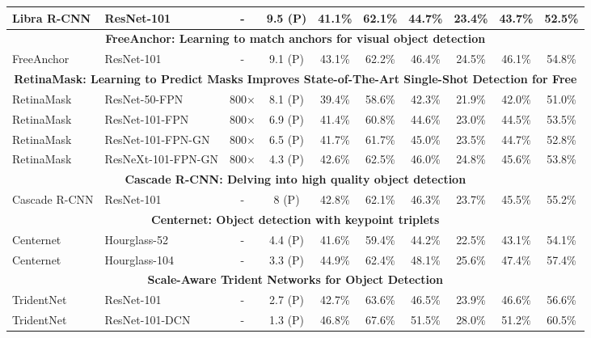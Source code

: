 \documentclass[10pt,twocolumn,letterpaper]{article}
\begin{document}
\begin{table*}[h]
\begin{threeparttable}[h]
\begin{tabular}{llcccccccc}
			Libra R-CNN & ResNet-101 & - & 9.5 (P) & 41.1\% & 62.1\% & 44.7\% & 23.4\% & 43.7\% & 52.5\% \\
			\midrule
			\multicolumn{10}{c}{\textbf{FreeAnchor: Learning to match anchors for visual object detection} \cite{zhang2019freeanchor}} \\
			FreeAnchor & ResNet-101 & - & 9.1 (P) & 43.1\% & 62.2\% & 46.4\% & 24.5\% & 46.1\% & 54.8\% \\
			\midrule
			\multicolumn{10}{c}{\textbf{RetinaMask: Learning to Predict Masks Improves State-of-The-Art Single-Shot Detection for Free \cite{fu2019retinamask}}} \\
			RetinaMask & ResNet-50-FPN & 800$\times$ & 8.1 (P) & 39.4\% & 58.6\% & 42.3\% & 21.9\% & 42.0\% & 51.0\% \\
			RetinaMask & ResNet-101-FPN & 800$\times$ & 6.9 (P) & 41.4\% & 60.8\% & 44.6\% & 23.0\% & 44.5\% & 53.5\% \\
			RetinaMask & ResNet-101-FPN-GN & 800$\times$ & 6.5 (P) & 41.7\% & 61.7\% & 45.0\% & 23.5\% & 44.7\% & 52.8\% \\
			RetinaMask & ResNeXt-101-FPN-GN & 800$\times$ & 4.3 (P) & 42.6\% & 62.5\% & 46.0\% & 24.8\% & 45.6\% & 53.8\% \\
			\midrule
			\multicolumn{10}{c}{\textbf{Cascade R-CNN: Delving into high quality object detection} \cite{cai2018cascade}} \\
			Cascade R-CNN & ResNet-101 & - & 8 (P) & 42.8\% & 62.1\% & 46.3\% & 23.7\% & 45.5\% & 55.2\% \\
			\midrule
			\multicolumn{10}{c}{\textbf{Centernet: Object detection with keypoint triplets} \cite{duan2019centernet}} \\
			Centernet & Hourglass-52 & - & 4.4 (P) & 41.6\% & 59.4\% & 44.2\% & 22.5\% & 43.1\% & 54.1\% \\
			Centernet & Hourglass-104 & - & 3.3 (P) & 44.9\% & 62.4\% & 48.1\% & 25.6\% & 47.4\% & 57.4\% \\
			\midrule
			\multicolumn{10}{c}{\textbf{Scale-Aware Trident Networks for Object Detection} \cite{li2019scale}} \\
			TridentNet & ResNet-101 & - & 2.7 (P) & 42.7\% & 63.6\% & 46.5\% & 23.9\% & 46.6\% & 56.6\% \\
			TridentNet & ResNet-101-DCN & - & 1.3 (P) & 46.8\% & 67.6\% & 51.5\% & 28.0\% & 51.2\% & 60.5\% \\
			\bottomrule
		\end{tabular}
	\end{threeparttable}
\end{table*}
\end{document}
